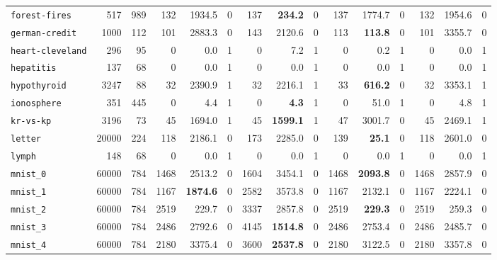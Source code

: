 \begin{tabular}{lccrrrrrrrrrrrr}
\texttt{forest-fires} & \multicolumn{1}{r}{517} & \multicolumn{1}{r}{989}  & 132 & 1934.5 & 0 & 137 & \textbf{234.2} & 0 & 137 & 1774.7 & 0 & 132 & 1954.6 & 0\\
\texttt{german-credit} & \multicolumn{1}{r}{1000} & \multicolumn{1}{r}{112}  & 101 & 2883.3 & 0 & 143 & 2120.6 & 0 & 113 & \textbf{113.8} & 0 & 101 & 3355.7 & 0\\
\texttt{heart-cleveland} & \multicolumn{1}{r}{296} & \multicolumn{1}{r}{95}  & 0 & 0.0 & 1 & 0 & 7.2 & 1 & 0 & 0.2 & 1 & 0 & 0.0 & 1\\
\texttt{hepatitis} & \multicolumn{1}{r}{137} & \multicolumn{1}{r}{68}  & 0 & 0.0 & 1 & 0 & 0.0 & 1 & 0 & 0.0 & 1 & 0 & 0.0 & 1\\
\texttt{hypothyroid} & \multicolumn{1}{r}{3247} & \multicolumn{1}{r}{88}  & 32 & 2390.9 & 1 & 32 & 2216.1 & 1 & 33 & \textbf{616.2} & 0 & 32 & 3353.1 & 1\\
\texttt{ionosphere} & \multicolumn{1}{r}{351} & \multicolumn{1}{r}{445}  & 0 & 4.4 & 1 & 0 & \textbf{4.3} & 1 & 0 & 51.0 & 1 & 0 & 4.8 & 1\\
\texttt{kr-vs-kp} & \multicolumn{1}{r}{3196} & \multicolumn{1}{r}{73}  & 45 & 1694.0 & 1 & 45 & \textbf{1599.1} & 1 & 47 & 3001.7 & 0 & 45 & 2469.1 & 1\\
\texttt{letter} & \multicolumn{1}{r}{20000} & \multicolumn{1}{r}{224}  & 118 & 2186.1 & 0 & 173 & 2285.0 & 0 & 139 & \textbf{25.1} & 0 & 118 & 2601.0 & 0\\
\texttt{lymph} & \multicolumn{1}{r}{148} & \multicolumn{1}{r}{68}  & 0 & 0.0 & 1 & 0 & 0.0 & 1 & 0 & 0.0 & 1 & 0 & 0.0 & 1\\
\texttt{mnist\_0} & \multicolumn{1}{r}{60000} & \multicolumn{1}{r}{784}  & 1468 & 2513.2 & 0 & 1604 & 3454.1 & 0 & 1468 & \textbf{2093.8} & 0 & 1468 & 2857.9 & 0\\
\texttt{mnist\_1} & \multicolumn{1}{r}{60000} & \multicolumn{1}{r}{784}  & 1167 & \textbf{1874.6} & 0 & 2582 & 3573.8 & 0 & 1167 & 2132.1 & 0 & 1167 & 2224.1 & 0\\
\texttt{mnist\_2} & \multicolumn{1}{r}{60000} & \multicolumn{1}{r}{784}  & 2519 & 229.7 & 0 & 3337 & 2857.8 & 0 & 2519 & \textbf{229.3} & 0 & 2519 & 259.3 & 0\\
\texttt{mnist\_3} & \multicolumn{1}{r}{60000} & \multicolumn{1}{r}{784}  & 2486 & 2792.6 & 0 & 4145 & \textbf{1514.8} & 0 & 2486 & 2753.4 & 0 & 2486 & 2485.7 & 0\\
\texttt{mnist\_4} & \multicolumn{1}{r}{60000} & \multicolumn{1}{r}{784}  & 2180 & 3375.4 & 0 & 3600 & \textbf{2537.8} & 0 & 2180 & 3122.5 & 0 & 2180 & 3357.8 & 0\\

\end{tabular}
